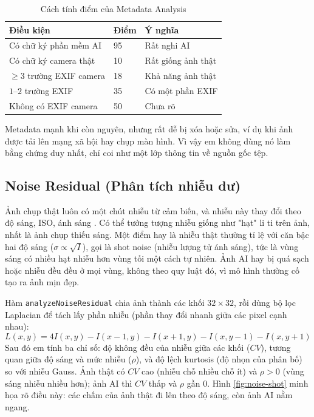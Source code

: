 \begin{table}[H]
\centering
\caption{Cách tính điểm của Metadata Analysis}
\label{tab:metadata-rules}
\begin{tabularx}{\textwidth}{p{}p{}Y}
\toprule
\textbf{Điều kiện} & \textbf{Điểm} & \textbf{Ý nghĩa} \\
\midrule
Có chữ ký phần mềm AI & 95 & Rất nghi AI \\
Có chữ ký camera thật & 10 & Rất giống ảnh thật \\
$\geq 3$ trường EXIF camera & 18 & Khả năng ảnh thật \\
$1$--$2$ trường EXIF & 35 & Có một phần EXIF \\
Không có EXIF camera & 50 & Chưa rõ \\
\bottomrule
\end{tabularx}
\end{table}

Metadata mạnh khi còn nguyên, nhưng rất dễ bị xóa hoặc sửa, ví dụ khi ảnh được tải lên mạng xã hội hay chụp màn hình. Vì vậy em không dùng nó làm bằng chứng duy nhất, chỉ coi như một lớp thông tin về nguồn gốc tệp.

\subsection{Noise Residual (Phân tích nhiễu dư)}
Ảnh chụp thật luôn có một chút nhiễu từ cảm biến, và nhiễu này thay đổi theo độ sáng, ISO, ánh sáng \cite{lukas,fridrich2009}. Có thể tưởng tượng nhiễu giống như "hạt" li ti trên ảnh, nhất là ảnh chụp thiếu sáng. Một điểm hay là nhiễu thật thường tỉ lệ với căn bậc hai độ sáng ($\sigma\propto\sqrt{I}$), gọi là shot noise (nhiễu lượng tử ánh sáng), tức là vùng sáng có nhiều hạt nhiễu hơn vùng tối một cách tự nhiên. Ảnh AI hay bị quá sạch hoặc nhiễu đều đều ở mọi vùng, không theo quy luật đó, vì mô hình thường cố tạo ra ảnh mịn đẹp.

Hàm \texttt{analyzeNoiseResidual} chia ảnh thành các khối $32\times32$, rồi dùng bộ lọc Laplacian để tách lấy phần nhiễu (phần thay đổi nhanh giữa các pixel cạnh nhau):
\[
L(x,y)=4I(x,y)-I(x{-}1,y)-I(x{+}1,y)-I(x,y{-}1)-I(x,y{+}1)
\]
Sau đó em tính ba chỉ số: độ không đều của nhiễu giữa các khối ($CV$), tương quan giữa độ sáng và mức nhiễu ($\rho$), và độ lệch kurtosis (độ nhọn của phân bố) so với nhiễu Gauss. Ảnh thật có $CV$ cao (nhiễu chỗ nhiều chỗ ít) và $\rho>0$ (vùng sáng nhiễu nhiều hơn); ảnh AI thì $CV$ thấp và $\rho$ gần 0. Hình \ref{fig:noise-shot} minh họa rõ điều này: các chấm của ảnh thật đi lên theo độ sáng, còn ảnh AI nằm ngang.

